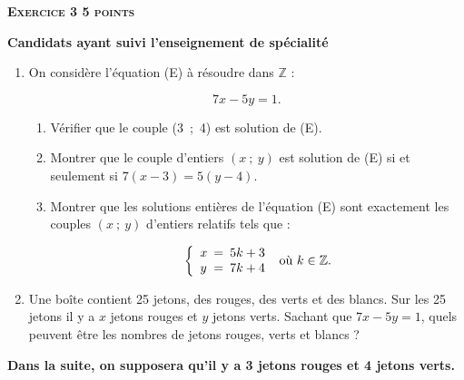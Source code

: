 \documentclass[10pt]{article}
\newcommand{\Z}{\mathbb{Z}}
\begin{document}
\vspace{0,5cm}

\textbf{\textsc{Exercice 3 \hfill 5 points}}

\textbf{Candidats ayant  suivi l'enseignement de spécialité} 

\medskip

\begin{enumerate}
\item On considère l'équation (E) à résoudre dans $\Z$ : 

\[7 x - 5 y = 1.\]

	\begin{enumerate}
		\item Vérifier que le couple (3~;~4) est solution de (E).
		\item Montrer que le couple d'entiers $(x~;~y)$ est solution de (E) si et seulement si
$7(x - 3) = 5(y - 4)$.
		\item Montrer que les solutions entières de l'équation (E) sont exactement les couples $(x~;~y)$ d'entiers relatifs tels que :
		
\[\left\{\begin{array}{l !{=} l}
x & 5k + 3\\
y & 7k + 4
\end{array}\right. \text{ où }  k \in \Z.\]
	\end{enumerate}		
\item Une boîte contient 25 jetons, des rouges, des verts et des blancs. Sur les 25 jetons il y a $x$ jetons rouges et $y$ jetons verts. Sachant que $7x - 5 y = 1$, quels peuvent être les nombres de jetons rouges, verts et blancs ?

\end{enumerate}

\textbf{Dans la suite, on supposera qu'il y a 3 jetons rouges et 4 jetons verts.}
\end{document}
